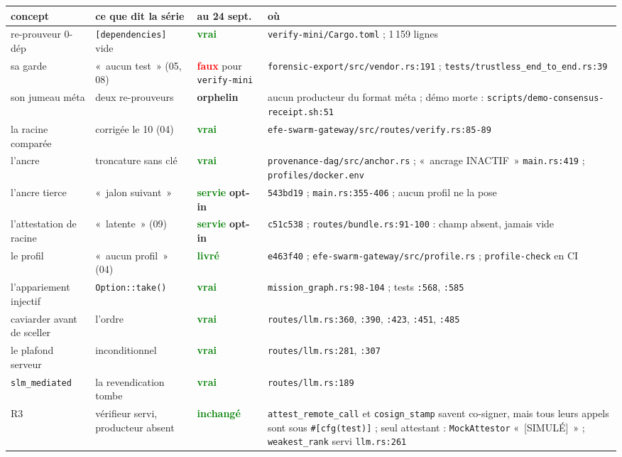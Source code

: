 \documentclass[10pt]{article}
\newcommand{\code}[1]{\texttt{\small #1}}
\newcommand{\loc}[1]{{\footnotesize\color{grey}\texttt{#1}}}
\newcommand{\ok}[1]{\textcolor{green}{\textbf{#1}}}
\newcommand{\ko}[1]{\textcolor{red}{\textbf{#1}}}
\newcommand{\att}[1]{\textcolor{amber}{\textbf{#1}}}
\begin{document}
{\small
\renewcommand{\arraystretch}{1.13}
\begin{longtable}{@{}L{3.3cm}L{4.2cm}L{2.2cm}L{7.0cm}@{}}
\toprule
\textbf{concept} & \textbf{ce que dit la série} & \textbf{au 24 sept.} & \textbf{où} \\ \midrule \endhead
re-prouveur 0-dép & \code{[dependencies]} vide & \ok{vrai} & \loc{verify-mini/Cargo.toml} ; 1\,159 lignes \\
sa garde & «~aucun test~» (05, 08) & \ko{faux} pour \code{verify-mini} & \loc{forensic-export/src/vendor.rs:191} ; \loc{tests/trustless\_end\_to\_end.rs:39} \\
son jumeau méta & deux re-prouveurs & \att{orphelin} & aucun producteur du format méta ; démo morte : \loc{scripts/demo-consensus-receipt.sh:51} \\
la racine comparée & corrigée le 10 (04) & \ok{vrai} & \loc{efe-swarm-gateway/src/routes/verify.rs:85-89} \\
l'ancre & troncature sans clé & \ok{vrai} & \loc{provenance-dag/src/anchor.rs} ; «~ancrage INACTIF~» \loc{main.rs:419} ; \loc{profiles/docker.env} \\
l'ancre tierce & «~jalon suivant~» & \ok{servie} \att{opt-in} & \code{543bd19} ; \loc{main.rs:355-406} ; aucun profil ne la pose \\
l'attestation de racine & «~latente~» (09) & \ok{servie} \att{opt-in} & \code{c51c538} ; \loc{routes/bundle.rs:91-100} : champ absent, jamais vide \\
le profil & «~aucun profil~» (04) & \ok{livré} & \code{e463f40} ; \loc{efe-swarm-gateway/src/profile.rs} ; \code{profile-check} en CI \\
l'appariement injectif & \code{Option::take()} & \ok{vrai} & \loc{mission\_graph.rs:98-104} ; tests \loc{:568}, \loc{:585} \\
caviarder avant de sceller & l'ordre & \ok{vrai} & \loc{routes/llm.rs:360}, \loc{:390}, \loc{:423}, \loc{:451}, \loc{:485} \\
le plafond serveur & inconditionnel & \ok{vrai} & \loc{routes/llm.rs:281}, \loc{:307} \\
\code{slm\_mediated} & la revendication tombe & \ok{vrai} & \loc{routes/llm.rs:189} \\
R3 & vérifieur servi, producteur absent & \ok{inchangé} & \code{attest\_remote\_call} et \code{cosign\_stamp} savent co-signer, mais tous leurs appels sont sous \code{\#[cfg(test)]} ; seul attestant : \code{MockAttestor} «~[SIMULÉ]~» ; \code{weakest\_rank} servi \loc{llm.rs:261} \\

\end{longtable}}
\end{document}
